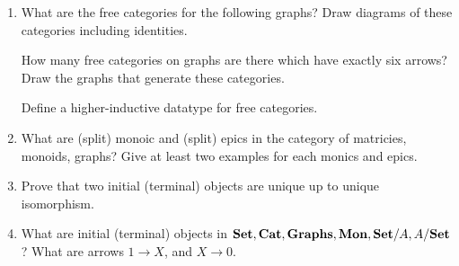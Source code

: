 \documentclass{scrartcl}
\begin{document}
\begin{enumerate}
\clearpage
\item
  What are the free categories for the following graphs? Draw diagrams of these categories including identities.
  \begin{center}
  \end{center}
  How many free categories on graphs are there which have exactly six arrows? Draw the graphs that generate these categories.

  Define a higher-inductive datatype for free categories.
  
\item
  What are (split) monoic and (split) epics in the category of matricies, monoids, graphs? Give at least two examples for each monics and epics.

\item Prove that two initial (terminal) objects are unique up to unique isomorphism.

\item What are initial (terminal) objects in $\mathbf{Set}, \mathbf{Cat}, \mathbf{Graphs}, \mathbf{Mon}, \mathbf{Set} / A, A / \mathbf{Set}$? What are arrows $1 \rightarrow X$, and $X \rightarrow 0$.
\end{enumerate}

\end{document}

